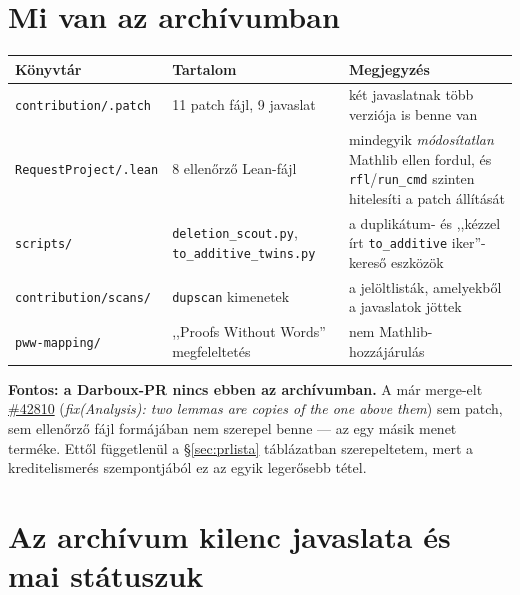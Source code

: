 \documentclass[11pt,a4paper]{article}
\newcommand{\lean}[1]{\texttt{\small #1}}
\newcommand{\bk}{\allowbreak}
\newcommand{\pr}[1]{\href{https://github.com/leanprover-community/mathlib4/pull/#1}{\##1}}
\begin{document}
\section{Mi van az archívumban}

\begin{center}
\small
\begin{tabular}{@{}p{5.3cm}p{4.2cm}p{6.2cm}@{}}
\toprule
\textbf{Könyvtár} & \textbf{Tartalom} & \textbf{Megjegyzés}\\
\midrule
\lean{contribution/\bk *.\bk patch} & 11 patch fájl, 9 javaslat & két javaslatnak több verziója is benne van\\
\lean{RequestProject/\bk *.\bk lean} & 8 ellenőrző Lean-fájl & mindegyik \emph{módosítatlan} Mathlib ellen fordul, és \lean{rfl}/\lean{run\_\bk cmd} szinten hitelesíti a patch állítását\\
\lean{scripts/\bk } & \lean{deletion\_\bk scout.\bk py}, \lean{to\_\bk additive\_\bk twins.\bk py} & a duplikátum- és ,,kézzel írt \lean{to\_\bk additive} iker''-kereső eszközök\\
\lean{contribution/\bk scans/\bk } & \lean{dupscan} kimenetek & a jelöltlisták, amelyekből a javaslatok jöttek\\
\lean{pww-mapping/\bk } & ,,Proofs Without Words'' megfeleltetés & nem Mathlib-hozzájárulás\\
\bottomrule
\end{tabular}
\end{center}

\medskip
\noindent\textbf{Fontos: a Darboux-PR nincs ebben az archívumban.} A már
merge-elt \pr{42810} (\emph{fix(Analysis): two lemmas are copies of the one
above them}) sem patch, sem ellenőrző fájl formájában nem szerepel benne ---
az egy másik menet terméke. Ettől függetlenül a \S\ref{sec:prlista}
táblázatban szerepeltetem, mert a kreditelismerés szempontjából ez az egyik
legerősebb tétel.

\section{Az archívum kilenc javaslata és mai státuszuk}
\end{document}
